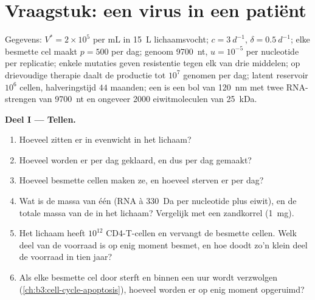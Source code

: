\section{Vraagstuk: een virus in een patiënt}

\begin{problem}
\label{pb:b3:virology:1}
Gegevens:  $V^{*} = 2\times 10^{5}$ per mL in \qty{15}{L}
lichaamsvocht; $c = \qty{3}{d^{-1}}$, $\delta = \qty{0.5}{d^{-1}}$; elke
besmette cel maakt $p = 500$  per dag; genoom \qty{9700}{nt},
$u = 10^{-5}$ per nucleotide per replicatie; enkele mutaties geven
resistentie tegen elk van drie middelen; op drievoudige therapie daalt
de productie tot $10^{7}$ genomen per dag; latent reservoir $10^{6}$
cellen, halveringstijd $44$ maanden; een  is een bol van
\qty{120}{nm} met twee RNA-strengen van \qty{9700}{nt} en ongeveer
\num{2000} eiwitmoleculen van \qty{25}{kDa}.

\medskip
\noindent\textbf{Deel I --- Tellen.}
\begin{enumerate}
  \item Hoeveel  zitten er in evenwicht in het lichaam?
  \item Hoeveel worden er per dag geklaard, en dus per dag gemaakt?
  \item Hoeveel besmette cellen maken ze, en hoeveel sterven er per
        dag?
  \item Wat is de massa van één  (RNA à \qty{330}{Da} per
        nucleotide plus eiwit), en de totale massa van de  in
        het lichaam? Vergelijk met een zandkorrel (\qty{1}{mg}).
  \item Het lichaam heeft $10^{12}$ CD4-T-cellen en vervangt de besmette
        cellen. Welk deel van de voorraad is op enig moment besmet, en
        hoe doodt zo'n klein deel de voorraad in tien jaar?
  \item Als elke besmette cel door  sterft en binnen een uur
        wordt verzwolgen (\cref{ch:b3:cell-cycle-apoptosis}), hoeveel
        worden er op enig moment opgeruimd?
\end{enumerate}


\end{problem}
